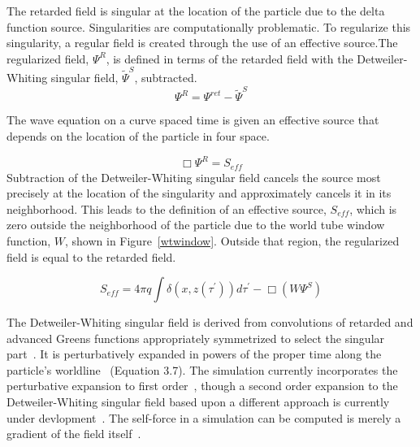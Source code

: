 The retarded field is singular at the location of the particle due to the delta function source. Singularities are computationally problematic. To regularize this singularity, a regular field is created through the use of an effective source.The regularized field, $\Psi^R$, is defined in terms of the retarded field with the Detweiler-Whiting singular field, $\tilde{\Psi}^S$, subtracted. 
\begin{equation}
\Psi^R=\Psi^{ret}-\tilde{\Psi}^S
\end{equation}


The wave equation on a curve spaced time is given an effective source that depends on the location of the particle in four space.

\begin{equation}
  \Box\Psi^R=S_{eff}
\end{equation}
Subtraction of the Detweiler-Whiting singular field cancels the source most precisely at the location of the singularity and approximately cancels it in its neighborhood. This leads to the definition of an effective source, $S_{eff}$, which is zero outside the neighborhood of the particle due to the world tube window function, $W$, shown in Figure~\ref{wtwindow}. Outside that region, the regularized field is equal to the retarded field.

\begin{equation}
S_{eff}=4\pi q\int\delta(x,z(\tau^\prime))d\tau^\prime-\Box(W\Psi^S)
\end{equation}

The Detweiler-Whiting singular field is derived from convolutions of retarded and advanced Greens functions appropriately symmetrized to select the singular part~\cite{detweiler_whiting}. It is perturbatively expanded in powers of the proper time along the particle's worldline~\cite{heffernan_ottewil_wardell_modesum_basisForCode} (Equation 3.7). The simulation currently incorporates the perturbative expansion to first order~\cite{heffernan_ottewil_wardell_modesum_basisForCode}, though a second order expansion to the Detweiler-Whiting singular field based upon a different approach is currently under devlopment~\cite{pound2ndOrderSelfForce2}. The self-force in a simulation can be computed is merely a gradient of the field itself~\cite{vega_wardell_diener_eff_source}. 



